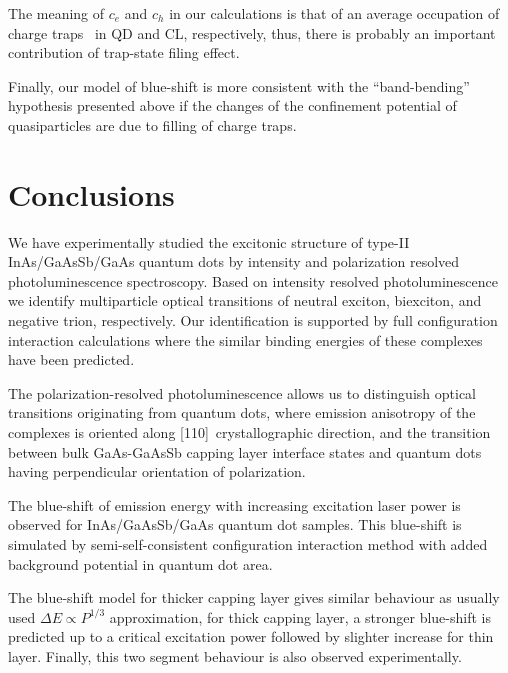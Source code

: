 The meaning of $c_e$ and $c_h$ in our calculations is that of an average occupation of charge traps~\cite{Reimer2016} in QD and CL, respectively, thus, there is probably an important contribution of trap-state filing effect. 

Finally, our model of blue-shift is more consistent with the ``band-bending'' hypothesis presented above if the changes of the confinement potential of quasiparticles are due to filling of charge traps.

\section*{Conclusions}
We have experimentally studied the excitonic structure of type-II InAs/GaAsSb/GaAs quantum dots by intensity and polarization resolved photoluminescence spectroscopy. Based on intensity resolved photoluminescence we identify multiparticle optical transitions of neutral exciton, biexciton, and negative trion, respectively. Our identification is supported by full configuration interaction calculations where the similar binding energies of these complexes have been predicted. 

The polarization-resolved photoluminescence allows us to distinguish optical transitions originating from quantum dots, where emission anisotropy of the complexes is oriented along [110]~crystallographic direction, and the transition between bulk GaAs-GaAsSb capping layer interface states and quantum dots having perpendicular orientation of polarization.

The blue-shift of emission energy with increasing excitation laser power is observed for InAs/GaAsSb/GaAs quantum dot samples. This blue-shift is simulated by semi-self-consistent configuration interaction method with added background potential in quantum dot area.

The blue-shift model for thicker capping layer gives similar behaviour as usually used $\Delta E\propto P^{1/3}$ approximation, for thick capping layer, a stronger blue-shift is predicted up to a critical excitation power followed by slighter increase for thin layer. Finally, this two segment behaviour is also observed experimentally.
\newpage